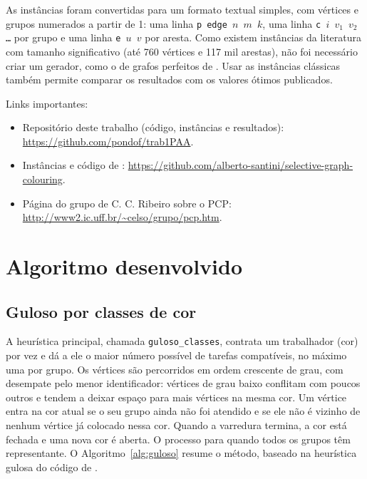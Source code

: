 \documentclass[12pt]{article}
\begin{document}
As instâncias foram convertidas para um formato textual simples, com vértices e
grupos numerados a partir de 1: uma linha \texttt{p edge $n$ $m$ $k$}, uma linha
\texttt{c $i$ $v_1$ $v_2$ \dots} por grupo e uma linha \texttt{e $u$ $v$} por
aresta. Como existem instâncias da literatura com tamanho significativo (até
760 vértices e 117 mil arestas), não foi necessário criar um gerador, como o
de grafos perfeitos de \cite{seker2021}. Usar as instâncias clássicas também
permite comparar os resultados com os valores ótimos publicados.

Links importantes:
\begin{itemize}
  \item Repositório deste trabalho (código, instâncias e resultados):
    \url{https://github.com/pondof/trab1PAA}.
  \item Instâncias e código de \cite{furini2018}:
    \url{https://github.com/alberto-santini/selective-graph-colouring}.
  \item Página do grupo de C. C. Ribeiro sobre o PCP:
    \url{http://www2.ic.uff.br/~celso/grupo/pcp.htm}.
\end{itemize}

\section{Algoritmo desenvolvido}\label{sec:algoritmo}

\subsection{Guloso por classes de cor}

A heurística principal, chamada \texttt{guloso\_classes}, contrata um
trabalhador (cor) por vez e dá a ele o maior número possível de tarefas
compatíveis, no máximo uma por grupo. Os vértices são percorridos em ordem
crescente de grau, com desempate pelo menor identificador: vértices de grau
baixo conflitam com poucos outros e tendem a deixar espaço para mais vértices
na mesma cor. Um vértice entra na cor atual se o seu grupo ainda não foi
atendido e se ele não é vizinho de nenhum vértice já colocado nessa cor. Quando
a varredura termina, a cor está fechada e uma nova cor é aberta. O processo
para quando todos os grupos têm representante. O Algoritmo~\ref{alg:guloso}
resume o método, baseado na heurística gulosa do código de \cite{santini2017}.
\end{document}
